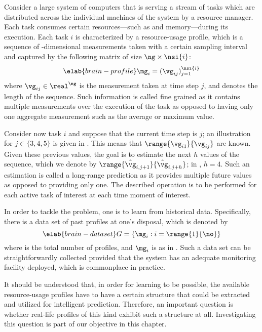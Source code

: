 Consider a large system of computers that is serving a stream of tasks which are
distributed across the individual machines of the system by a resource manager.
Each task consumes certain resources---such as  and memory---during its
execution. Each task $i$ is characterized by a resource-usage profile, which is
a sequence of \ng-dimensional measurements taken with a certain sampling
interval and captured by the following matrix of size $\ng \times \nsi{i}$:
\begin{equation} \elab{brain-profile}
  \mg_i = (\vg_{ij})_{j = 1}^\nsi{i}
\end{equation}
where $\vg_{ij} \in \real^\ng$ is the measurement taken at time step $j$, and
 denotes the length of the sequence. Such information is called
fine grained as it contains multiple measurements over the execution of the task
as opposed to having only one aggregate measurement such as the average or
maximum value.

Consider now task $i$ and suppose that the current time step is $j$; an
illustration for $j \in \{ 3, 4, 5 \}$ is given in .
This means that $\range{\vg_{i1}}{\vg_{ij}}$ are known. Given these previous
values, the goal is to estimate the next $h$ values of the sequence, which we
denote by $\range{\hat{\vg}_{i, j + 1}}{\hat{\vg}_{i, j + h}}$; in
, $h = 4$. Such an estimation is called a long-range
prediction as it provides multiple future values as opposed to providing only
one. The described operation is to be performed for each active task of interest
at each time moment of interest.

In order to tackle the problem, one is to learn from historical data.
Specifically, there is a data set of past profiles at one's disposal, which is
denoted by
\begin{equation} \elab{brain-dataset}
  G = \left\{ \mg_i: i = \range{1}{\no} \right\}
\end{equation}
where \no is the total number of profiles, and $\mg_i$ is as in
. Such a data set can be straightforwardly collected
provided that the system has an adequate monitoring facility deployed, which is
commonplace in practice.

It should be understood that, in order for learning to be possible, the
available resource-usage profiles have to have a certain structure that could be
extracted and utilized for intelligent prediction. Therefore, an important
question is whether real-life profiles of this kind exhibit such a structure at
all. Investigating this question is part of our objective in this chapter.

